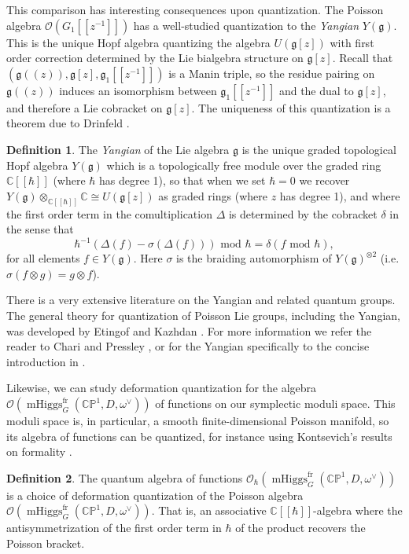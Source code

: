 \documentclass[11pt, oneside, reqno]{amsart}
\theoremstyle{definition} \newtheorem{definition}{Definition}[section]
\theoremstyle{definition} \newtheorem{remark}[definition]{Remark}
\theoremstyle{definition} \newtheorem{remarks}[definition]{Remarks}
\theoremstyle{definition} \newtheorem{question}[definition]{Question}
\theoremstyle{definition} \newtheorem*{note}{Note}
\theoremstyle{definition} \newtheorem{example}[definition]{Example}
\theoremstyle{definition} \newtheorem{examples}[definition]{Examples}
\renewcommand{\gg}{\mathfrak{g}}
\newcommand{\bb}[1]{\mathbb{#1}}
\newcommand{\CC}{\mathbb{C}}
\newcommand{\OO}{\mathcal{O}}
\newcommand{\iso}{\cong}
\DeclareMathOperator{\mhiggs}{mHiggs}
\newcommand{\fr}{\mathrm{fr}}
\begin{document}
This comparison has interesting consequences upon quantization.  The Poisson algebra $\OO(G_1[[z^{-1}]])$ has a well-studied quantization to the \emph{Yangian} $Y(\gg)$.  This is the unique Hopf algebra quantizing the algebra $U(\gg[z])$ with first order correction determined by the Lie bialgebra structure on $\gg[z]$.  Recall that $(\gg(\!(z)\!), \gg[z], \gg_1[[z^{-1}]])$ is a Manin triple, so the residue pairing on $\gg(\!(z)\!)$ induces an isomorphism between $\gg_1[[z^{-1}]]$ and the dual to $\gg[z]$, and therefore a Lie cobracket on $\gg[z]$.  The uniqueness of this quantization is a theorem due to Drinfeld {\cite[Theorem 2]{DrinfeldQuantum1}}.

\begin{definition}
The \emph{Yangian} of the Lie algebra $\gg$ is the unique graded topological Hopf algebra $Y(\gg)$ which is a topologically free module over the graded ring $\CC[[\hbar]]$ (where $\hbar$ has degree 1), so that when we set $\hbar=0$ we recover $Y(\gg) \otimes_{\CC[[\hbar]]} \CC \iso U(\gg[z])$ as graded rings (where $z$ has degree 1), and where the first order term in the comultiplication $\Delta$ is determined by the cobracket $\delta$ in the sense that
\[\hbar^{-1}(\Delta(f) - \sigma(\Delta(f))) \text{ mod } \hbar = \delta(f \text{ mod } \hbar),\]
for all elements $f \in Y(\gg)$.  Here $\sigma$ is the braiding automorphism of $Y(\gg)^{\otimes 2}$ (i.e. $\sigma(f \otimes g) = g \otimes f$).
\end{definition}

There is a very extensive literature on the Yangian and related quantum groups.  The general theory for quantization of Poisson Lie groups, including the Yangian, was developed by Etingof and Kazhdan \cite{EtingofKazhdanIII}.  For more information we refer the reader to Chari and Pressley \cite{ChariPressley}, or for the Yangian specifically to the concise introduction in \cite[Section 9]{CostelloYangian}.

Likewise, we can study deformation quantization for the algebra $\OO(\mhiggs^\fr_G(\bb{CP}^1,D,\omega^\vee))$ of functions on our symplectic moduli space.  This moduli space is, in particular, a smooth finite-dimensional Poisson manifold, so its algebra of functions can be quantized, for instance using Kontsevich's results on formality \cite{KontsevichQuantization}.

\begin{definition}
The quantum algebra of functions $\OO_\hbar(\mhiggs^\fr_G(\bb{CP}^1,D,\omega^\vee))$ is a choice of deformation quantization of the Poisson algebra $\OO(\mhiggs^\fr_G(\bb{CP}^1,D,\omega^\vee))$.  That is, an associative $\CC[[\hbar]]$-algebra where the antisymmetrization of the first order term in $\hbar$ of the product recovers the Poisson bracket. 
\end{definition}
\end{document}
